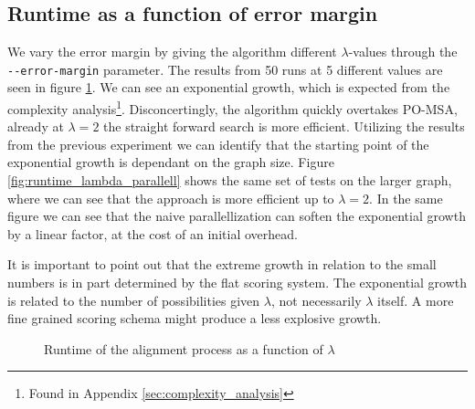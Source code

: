 \documentclass[thesis.tex]{subfiles}
\begin{document}
\subsection*{Runtime as a function of error margin}
We vary the error margin by giving the algorithm different $\lambda$-values through the \texttt{-{}-error-margin} parameter. The results from 50 runs at 5 different values are seen in figure \ref{fig:runtime_lambda}. We can see an exponential growth, which is expected from the complexity analysis\footnote{Found in Appendix \ref{sec:complexity_analysis}}. Disconcertingly, the algorithm quickly overtakes PO-MSA, already at $\lambda=2$ the straight forward search is more efficient. Utilizing the results from the previous experiment we can identify that the starting point of the exponential growth is dependant on the graph size. Figure \ref{fig:runtime_lambda_parallell} shows the same set of tests on the larger graph, where we can see that the approach is more efficient up to $\lambda=2$. In the same figure we can see that the naive parallellization can soften the exponential growth by a linear factor, at the cost of an initial overhead.\\
\par\noindent
It is important to point out that the extreme growth in relation to the small numbers is in part determined by the flat scoring system. The exponential growth is related to the number of possibilities given $\lambda$, not necessarily $\lambda$ itself. A more fine grained scoring schema might produce a less explosive growth.\\
\begin{figure}[!hb]
  \caption{Runtime of the alignment process as a function of $\lambda$}
  \label{fig:runtime_lambda}
\end{figure}
\end{document}
